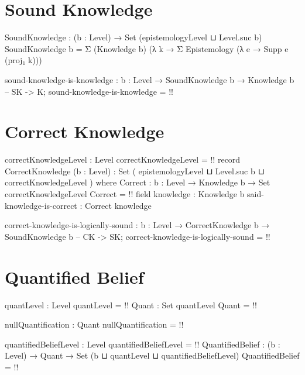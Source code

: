 \documentclass{article}
\begin{document}
\section{Sound Knowledge}

\begin{code}
SoundKnowledge : (b : Level) → Set (epistemologyLevel ⊔ Level.suc b)
SoundKnowledge b = Σ (Knowledge b) (λ k → Σ Epistemology (λ e → Supp e (proj₁ k)))
\end{code}

\begin{code}
sound-knowledge-is-knowledge : {b : Level} → SoundKnowledge b → Knowledge b -- SK -> K;
sound-knowledge-is-knowledge = {!!}
\end{code}

\section{Correct Knowledge}

\begin{code}
correctKnowledgeLevel : Level
correctKnowledgeLevel = {!!}
record CorrectKnowledge (b : Level) :
                        Set ( epistemologyLevel
                             ⊔ Level.suc b
                             ⊔ correctKnowledgeLevel
                             ) where
  Correct : {b : Level} → Knowledge b → Set correctKnowledgeLevel
  Correct = {!!}
  field
    knowledge : Knowledge b
    said-knowledge-is-correct : Correct knowledge
\end{code}

\begin{code}
correct-knowledge-is-logically-sound :
  {b : Level} → CorrectKnowledge b → SoundKnowledge b -- CK -> SK;
correct-knowledge-is-logically-sound = {!!}
\end{code}

\section{Quantified Belief}

\begin{code}
quantLevel : Level
quantLevel = {!!}
Quant : Set quantLevel
Quant = {!!}
\end{code}

\begin{code}
nullQuantification : Quant
nullQuantification = {!!}
\end{code}

\begin{code}
quantifiedBeliefLevel : Level
quantifiedBeliefLevel = {!!}
QuantifiedBelief : (b : Level) → Quant → Set (b ⊔ quantLevel ⊔ quantifiedBeliefLevel)
QuantifiedBelief = {!!}
\end{code}
\end{document}
